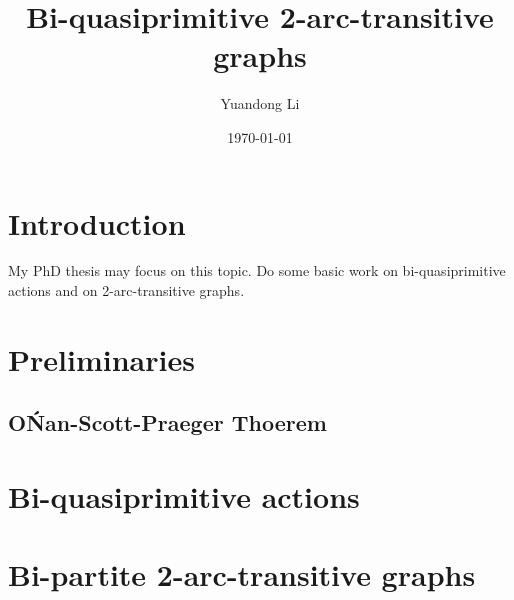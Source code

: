\documentclass[a4,11pt]{article}
\title{Bi-quasiprimitive 2-arc-transitive graphs}
\author{Yuandong Li}
\date{\today}
\begin{document}
\maketitle

\tableofcontents

\section{Introduction}
My PhD thesis may focus on this topic. 
Do some basic work on bi-quasiprimitive actions and on 2-arc-transitive graphs.

\section{Preliminaries}
\subsection{O\'Nan-Scott-Praeger Thoerem}

\section{Bi-quasiprimitive actions}

\section{Bi-partite 2-arc-transitive graphs}
\end{document}
